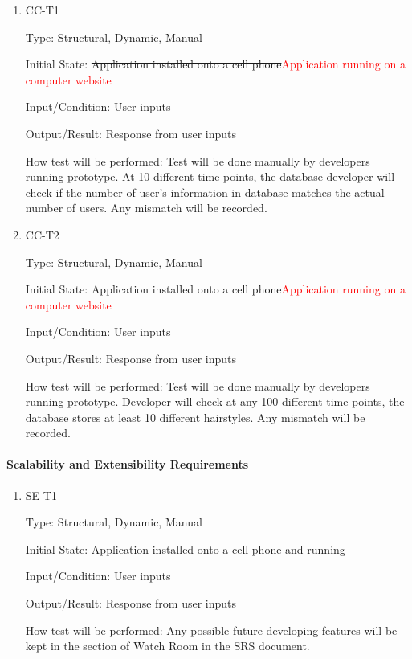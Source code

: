 \documentclass[12pt, titlepage]{article}
\begin{document}
\begin{enumerate}

\item{CC-T1\\}

Type: Structural, Dynamic, Manual
					
Initial State: \sout{Application installed onto a cell phone}\textcolor{red}{Application running on a computer website}
					
Input/Condition: User inputs
					
Output/Result: Response from user inputs
					
How test will be performed: Test will be done manually by developers running prototype. At 10 different time points, the database developer will check if the number of user's information in database matches the actual number of users. Any mismatch will be recorded.
					
\item{CC-T2\\}

Type: Structural, Dynamic, Manual
					
Initial State: \sout{Application installed onto a cell phone}\textcolor{red}{Application running on a computer website}
					
Input/Condition: User inputs
					
Output/Result: Response from user inputs
					
How test will be performed: Test will be done manually by developers running prototype. Developer will check at any 100 different time points, the database stores at least 10 different hairstyles. Any mismatch will be recorded.

\end{enumerate}

\paragraph{Scalability and Extensibility Requirements}

\begin{enumerate}

\item{SE-T1\\}

Type: Structural, Dynamic, Manual
					
Initial State: Application installed onto a cell phone and running
					
Input/Condition: User inputs
					
Output/Result: Response from user inputs
					
How test will be performed: Any possible future developing features will be kept in the section of
Watch Room in the SRS document.

\end{enumerate}
\end{document}
